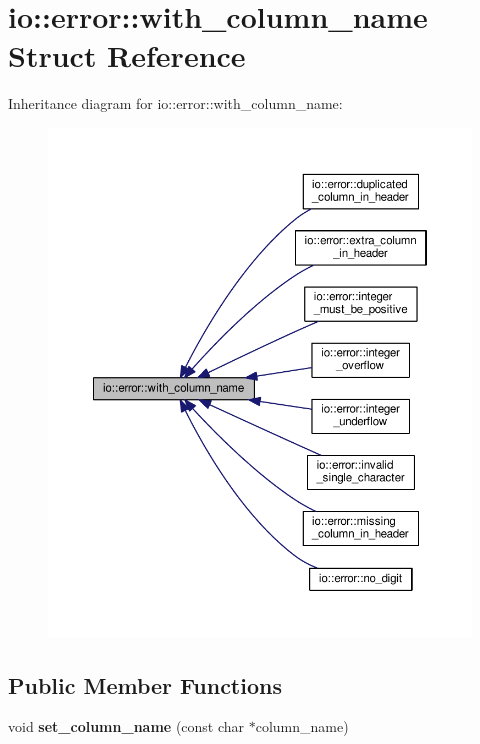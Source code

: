 \section{io\+:\+:error\+:\+:with\+\_\+column\+\_\+name Struct Reference}
\label{structio_1_1error_1_1with__column__name}


Inheritance diagram for io\+:\+:error\+:\+:with\+\_\+column\+\_\+name\+:\nopagebreak
\begin{figure}[H]
\begin{center}
\leavevmode
\includegraphics[width=350pt]{structio_1_1error_1_1with__column__name__inherit__graph}
\end{center}
\end{figure}
\subsection*{Public Member Functions}
\begin{DoxyCompactItemize}
\item 
void {\bfseries set\+\_\+column\+\_\+name} (const char $\ast$column\+\_\+name)\label{structio_1_1error_1_1with__column__name_a2a8144d3591a4bb618368ca7261befef}

\end{DoxyCompactItemize}

